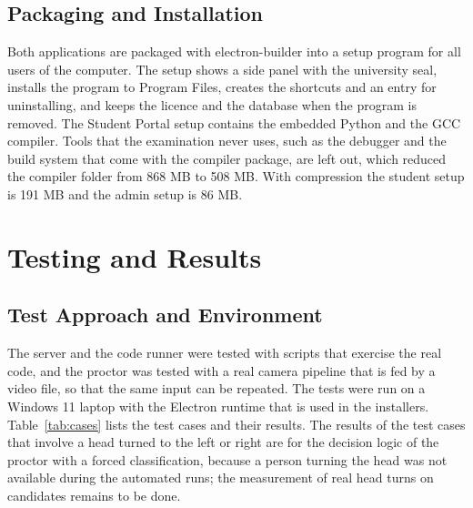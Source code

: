 \documentclass[12pt,a4paper]{report}
\begin{document}
\section{Packaging and Installation}
Both applications are packaged with electron-builder into a setup program for all users of the computer. The setup shows a side panel with the university seal, installs the program to Program Files, creates the shortcuts and an entry for uninstalling, and keeps the licence and the database when the program is removed. The Student Portal setup contains the embedded Python and the GCC compiler. Tools that the examination never uses, such as the debugger and the build system that come with the compiler package, are left out, which reduced the compiler folder from 868 MB to 508 MB. With compression the student setup is 191 MB and the admin setup is 86 MB.

\chapter{Testing and Results}

\section{Test Approach and Environment}
The server and the code runner were tested with scripts that exercise the real code, and the proctor was tested with a real camera pipeline that is fed by a video file, so that the same input can be repeated. The tests were run on a Windows 11 laptop with the Electron runtime that is used in the installers. Table~\ref{tab:cases} lists the test cases and their results. The results of the test cases that involve a head turned to the left or right are for the decision logic of the proctor with a forced classification, because a person turning the head was not available during the automated runs; the measurement of real head turns on candidates remains to be done.
\end{document}
